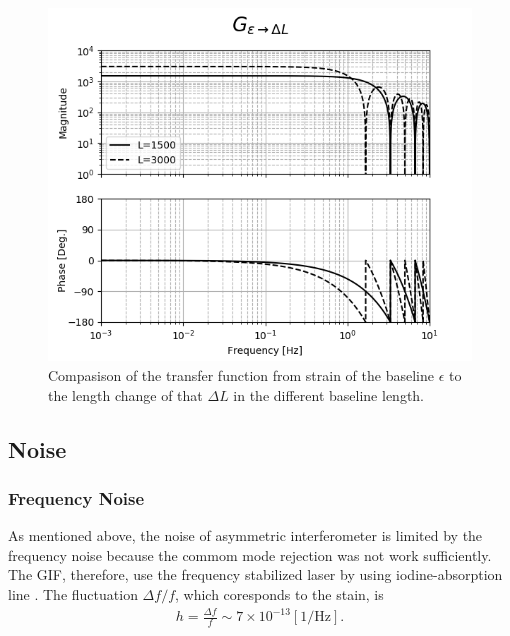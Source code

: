 \begin{figure}[p]
  \begin{center}
    \includegraphics[width=13.0cm]{./img_chap4/img412.png}
    \caption{Compasison of the transfer function from strain of the baseline $\epsilon$ to the length change of that $\Delta{L}$ in the different baseline length.}\label{img:img411_a}
  \end{center}
\end{figure}

\subsection{Noise}
\subsubsection{Frequency Noise} \label{sec:123}
As mentioned above, the noise of asymmetric interferometer is limited by the frequency noise because the commom mode rejection was not work sufficiently. The GIF, therefore, use the frequency stabilized laser by using iodine-absorption line \cite{araya2017design}. The fluctuation $\Delta{f}/f$, which coresponds to the stain, is
\begin{eqnarray}
  h = \frac{\Delta{f}}{f} \sim 7\times10^{-13} [\mathrm{1/\mathrm{Hz}}].
\end{eqnarray}


